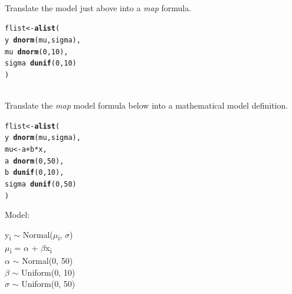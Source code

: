 \documentclass[12pt]{article}\usepackage[]{graphicx}\usepackage[]{color}
\makeatletter
\newcommand{\hlnum}[1]{\textcolor[rgb]{0.686,0.059,0.569}{#1}}%
\newcommand{\hlopt}[1]{\textcolor[rgb]{0,0,0}{#1}}%
\newcommand{\hlstd}[1]{\textcolor[rgb]{0.345,0.345,0.345}{#1}}%
\newcommand{\hlkwb}[1]{\textcolor[rgb]{0.69,0.353,0.396}{#1}}%
\newcommand{\hlkwd}[1]{\textcolor[rgb]{0.737,0.353,0.396}{\textbf{#1}}}%
\newenvironment{kframe}{%
 \def\at@end@of@kframe{}%
 \ifinner\ifhmode%
  \def\at@end@of@kframe{\end{minipage}}%
  \begin{minipage}{\columnwidth}%
 \fi\fi%
 \def\FrameCommand##1{\hskip\@totalleftmargin \hskip-\fboxsep
 \colorbox{shadecolor}{##1}\hskip-\fboxsep
     \hskip-\linewidth \hskip-\@totalleftmargin \hskip\columnwidth}%
 \MakeFramed {\advance\hsize-\width
   \@totalleftmargin\z@ \linewidth\hsize
   \@setminipage}}%
 {\par\unskip\endMakeFramed%
 \at@end@of@kframe}
\newenvironment{knitrout}{}{} %
\newenvironment{problem}[2][Problem]{\begin{trivlist}
\item[\hskip \labelsep {\bfseries #1}\hskip \labelsep {\bfseries #2.}]}{\end{trivlist}}
\makeatother
\begin{document}
\begin{problem}{4M2}
\text{}\\
Translate the model just above into a \textit{map} formula.
\end{problem}

\begin{knitrout}
\color{fgcolor}\begin{kframe}
\begin{alltt}
\hlstd{flist} \hlkwb{<-} \hlkwd{alist}\hlstd{(}
  \hlstd{y} \hlopt{~} \hlkwd{dnorm}\hlstd{(mu, sigma),}
  \hlstd{mu} \hlopt{~} \hlkwd{dnorm}\hlstd{(}\hlnum{0}\hlstd{,} \hlnum{10}\hlstd{),}
  \hlstd{sigma} \hlopt{~} \hlkwd{dunif}\hlstd{(}\hlnum{0}\hlstd{,} \hlnum{10}\hlstd{)}
\hlstd{)}
\end{alltt}
\end{kframe}
\end{knitrout}

\begin{problem}{4M3}
\text{}\\
Translate the \textit{map} model formula below into a mathematical model definition.

\begin{knitrout}
\color{fgcolor}\begin{kframe}
\begin{alltt}
\hlstd{flist} \hlkwb{<-} \hlkwd{alist}\hlstd{(}
  \hlstd{y} \hlopt{~} \hlkwd{dnorm}\hlstd{(mu, sigma),}
  \hlstd{mu} \hlkwb{<-} \hlstd{a} \hlopt{+}\hlstd{b}\hlopt{*}\hlstd{x,}
  \hlstd{a} \hlopt{~} \hlkwd{dnorm}\hlstd{(}\hlnum{0}\hlstd{,} \hlnum{50}\hlstd{),}
  \hlstd{b} \hlopt{~} \hlkwd{dunif}\hlstd{(}\hlnum{0}\hlstd{,} \hlnum{10}\hlstd{),}
  \hlstd{sigma} \hlopt{~} \hlkwd{dunif}\hlstd{(}\hlnum{0}\hlstd{,} \hlnum{50}\hlstd{)}
\hlstd{)}
\end{alltt}
\end{kframe}
\end{knitrout}
\end{problem}

Model:
\begin{center}
y\textsubscript{i} $\sim$ Normal($\mu$\textsubscript{i}, $\sigma$)\\
$\mu$\textsubscript{i} = $\alpha$ + $\beta$x\textsubscript{i}\\
$\alpha$ $\sim$ Normal(0, 50)\\
$\beta$ $\sim$ Uniform(0, 10)\\
$\sigma$ $\sim$ Uniform(0, 50)
\end{center}
\end{document}
